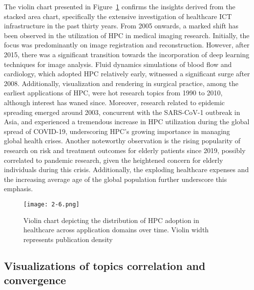The violin chart presented in Figure~\ref{fig:2-6} confirms the insights derived from the stacked area chart, specifically the extensive investigation of healthcare ICT infrastructure in the past thirty years. From 2005 onwards, a marked shift has been observed in the utilization of HPC in medical imaging research. Initially, the focus was predominantly on image registration and reconstruction. However, after 2015, there was a significant transition towards the incorporation of deep learning techniques for image analysis. Fluid dynamics simulations of blood flow and cardiology, which adopted HPC relatively early, witnessed a significant surge after 2008. Additionally, visualization and rendering in surgical practice, among the earliest applications of HPC, were hot research topics from 1990 to 2010, although interest has waned since. Moreover, research related to epidemic spreading emerged around 2003, concurrent with the SARS-CoV-1 outbreak in Asia, and experienced a tremendous increase in HPC utilization during the global spread of COVID-19, underscoring HPC's growing importance in managing global health crises. Another noteworthy observation is the rising popularity of research on risk and treatment outcomes for elderly patients since 2019, possibly correlated to pandemic research, given the heightened concern for elderly individuals during this crisis. Additionally, the exploding healthcare expenses and the increasing average age of the global population further underscore this emphasis.
\begin{figure}[!h]
\centering
\texttt{[image: 2-6.png]}
\caption{Violin chart depicting the distribution of HPC adoption in healthcare across application domains over time. Violin width represents publication density}
\label{fig:2-6}
\end{figure}

\subsection{Visualizations of topics correlation and convergence}\label{subse:2-3.4}

